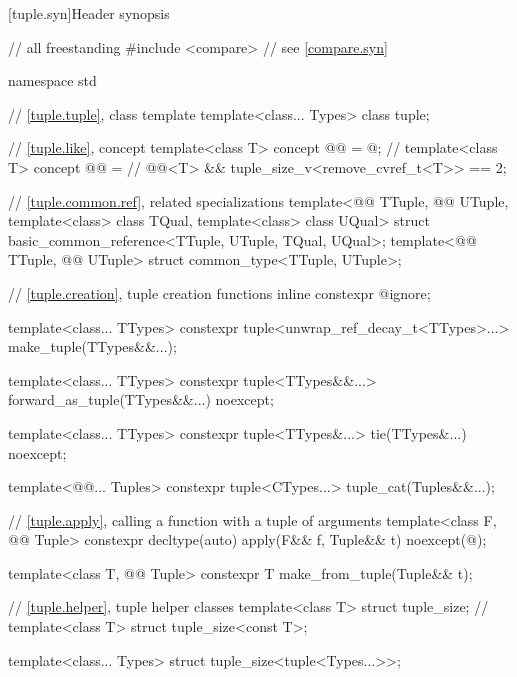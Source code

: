 [tuple.syn]{Header  synopsis}

%
\begin{codeblock}
// all freestanding
#include <compare>              // see \ref{compare.syn}

namespace std {
  // \ref{tuple.tuple}, class template 
  template<class... Types>
    class tuple;

  // \ref{tuple.like}, concept 
  template<class T>
    concept @@ = @\seebelownc@;         // \expos
  template<class T>
    concept @@ =                     // \expos
      @@<T> && tuple_size_v<remove_cvref_t<T>> == 2;

  // \ref{tuple.common.ref},  related specializations
  template<@@ TTuple, @@ UTuple,
           template<class> class TQual, template<class> class UQual>
    struct basic_common_reference<TTuple, UTuple, TQual, UQual>;
  template<@@ TTuple, @@ UTuple>
    struct common_type<TTuple, UTuple>;

  // \ref{tuple.creation}, tuple creation functions
  inline constexpr @\unspec@ ignore;

  template<class... TTypes>
    constexpr tuple<unwrap_ref_decay_t<TTypes>...> make_tuple(TTypes&&...);

  template<class... TTypes>
    constexpr tuple<TTypes&&...> forward_as_tuple(TTypes&&...) noexcept;

  template<class... TTypes>
    constexpr tuple<TTypes&...> tie(TTypes&...) noexcept;

  template<@@... Tuples>
    constexpr tuple<CTypes...> tuple_cat(Tuples&&...);

  // \ref{tuple.apply}, calling a function with a tuple of arguments
  template<class F, @@ Tuple>
    constexpr decltype(auto) apply(F&& f, Tuple&& t) noexcept(@\seebelow@);

  template<class T, @@ Tuple>
    constexpr T make_from_tuple(Tuple&& t);

  // \ref{tuple.helper}, tuple helper classes
  template<class T> struct tuple_size;                  // \notdef
  template<class T> struct tuple_size<const T>;

  template<class... Types> struct tuple_size<tuple<Types...>>;

}
\end{codeblock}
